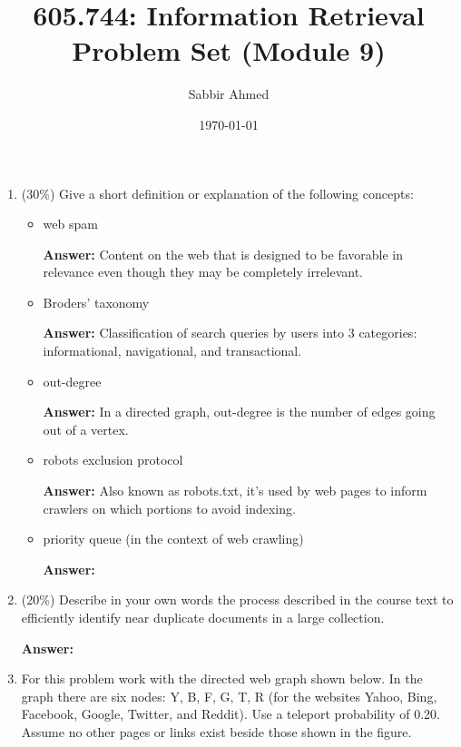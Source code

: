\documentclass[11pt]{article}
\title{605.744: Information Retrieval \\ Problem Set (Module 9)}
\author{Sabbir Ahmed}
\date{\today}
\begin{document}
\maketitle

    \begin{enumerate}

        \item (30\%) Give a short definition or explanation of the following concepts:
        \begin{itemize}
            \item web spam

            \textbf{Answer:} Content on the web that is designed to be favorable in relevance even though they may be completely irrelevant.

            \item Broders' taxonomy

            \textbf{Answer:} Classification of search queries by users into 3 categories: informational, navigational, and transactional.

            \item out-degree

            \textbf{Answer:} In a directed graph, out-degree is the number of edges going out of a vertex.

            \item robots exclusion protocol

            \textbf{Answer:} Also known as robots.txt, it's used by web pages to inform crawlers on which portions to avoid indexing.

            \item priority queue (in the context of web crawling)

            \textbf{Answer:} 

        \end{itemize}

        \item (20\%) Describe in your own words the process described in the course text to efficiently identify near duplicate documents in a large collection.

        \textbf{Answer:}

        \item For this problem work with the directed web graph shown below. In the graph there are six nodes: Y, B, F, G, T, R (for the websites Yahoo, Bing, Facebook, Google, Twitter, and Reddit). Use a teleport probability of 0.20. Assume no other pages or links exist beside those shown in the figure.


\end{enumerate}
\end{document}
